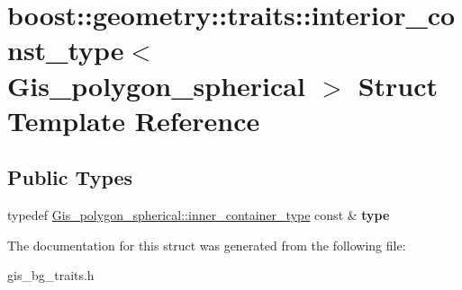 \hypertarget{structboost_1_1geometry_1_1traits_1_1interior__const__type_3_01Gis__polygon__spherical_01_4}{}\section{boost\+:\+:geometry\+:\+:traits\+:\+:interior\+\_\+const\+\_\+type$<$ Gis\+\_\+polygon\+\_\+spherical $>$ Struct Template Reference}
\label{structboost_1_1geometry_1_1traits_1_1interior__const__type_3_01Gis__polygon__spherical_01_4}
\subsection*{Public Types}
\begin{DoxyCompactItemize}
\item 
\mbox{\label{structboost_1_1geometry_1_1traits_1_1interior__const__type_3_01Gis__polygon__spherical_01_4_aa347c7a02e6f295c24324cbd7488f992}} 
typedef \mbox{\hyperlink{classGis__wkb__vector}{Gis\+\_\+polygon\+\_\+spherical\+::inner\+\_\+container\+\_\+type}} const  \& {\bfseries type}
\end{DoxyCompactItemize}


The documentation for this struct was generated from the following file\+:\begin{DoxyCompactItemize}
\item 
gis\+\_\+bg\+\_\+traits.\+h\end{DoxyCompactItemize}
